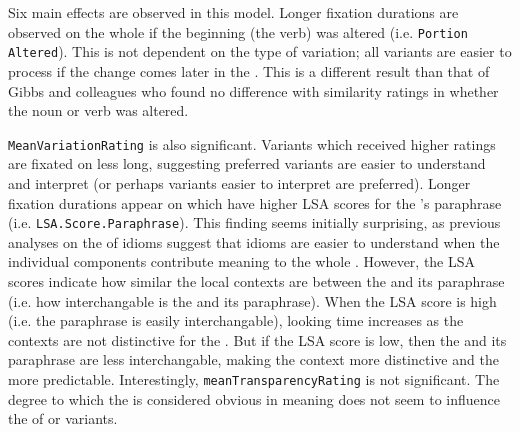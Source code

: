 \documentclass[output=paper
,modfonts
,nonflat]{langsci/langscibook}
\begin{document}



Six main effects are observed in this model. Longer fixation durations are observed on the whole   if the beginning (the verb) was altered (i.e. \texttt{Portion Altered}). This is not dependent on the type of variation; all variants are easier to process  if the change comes later in the . This is a different result than that of Gibbs and colleagues \citep{GibbsEtAl1989, GibbsNayak1989} who found no difference with similarity ratings in whether the noun or verb was altered. %

\texttt{MeanVariationRating} is also significant. Variants which received higher  ratings are fixated on less long, suggesting preferred variants  are easier to understand and interpret (or perhaps variants easier to interpret are preferred). Longer fixation durations appear on  which have higher LSA scores for the 's paraphrase (i.e. \texttt{LSA.Score.Paraphrase}). This finding seems initially surprising, as previous analyses on the  of idioms suggest that idioms are easier to understand when the individual components contribute meaning  to the whole \citep{GibbsEtAl1989}. However, the LSA scores indicate how similar the local contexts are between the  and its paraphrase (i.e. how interchangable is the  and its paraphrase). When the LSA score is high (i.e. the paraphrase is easily interchangable), looking time increases as the contexts are not distinctive for the . But if the LSA score is low, then the  and its paraphrase are less interchangable, making the context more distinctive and the  more predictable.  Interestingly, \texttt{meanTransparencyRating} is not significant. The degree to which the  is considered obvious in meaning does not seem to influence the  of  or variants. %
\end{document}
